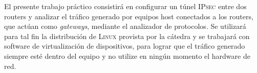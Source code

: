 

	El presente trabajo práctico consistirá en configurar un túnel \textsc{IPsec} entre dos routers y analizar el tráfico generado por equipos host conectados a los routers, que actúan como \emph{gateways}, mediante el analizador de protocolos. Se utilizará para tal fin la distribución de \textsc{Linux} provista por la cátedra y se trabajará con software de virtualización de dispositivos, para lograr que el tráfico generado siempre esté dentro del equipo y no utilize en ningún momento el hardware de red.

